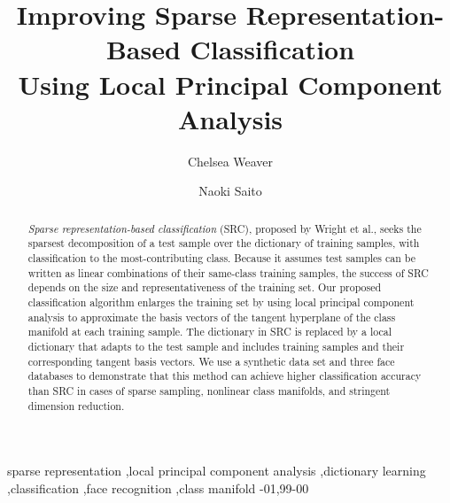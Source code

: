 \documentclass[review]{elsarticle}
\begin{document}
\theoremstyle{remark}
\newtheorem{rem}{Remark}


\begin{frontmatter}

\title{Improving Sparse Representation-Based Classification\\
 Using Local Principal Component Analysis}


\author{Chelsea Weaver}

\author{Naoki Saito}

\address{Department of Mathematics\\
University of California, Davis \\
One Shields Avenue\\
Davis, California, 95616, United States}


\begin{abstract}
\emph{Sparse representation-based classification} (SRC), proposed by Wright et al., seeks the sparsest decomposition of a test sample over the dictionary of training samples, with classification to the most-contributing class. Because it assumes test samples can be written as linear combinations of their same-class training samples, the success of SRC depends on the size and representativeness of the training set. Our proposed classification algorithm enlarges the training set by using local principal component analysis to approximate the basis vectors of the tangent hyperplane of the class manifold at each training sample. The dictionary in SRC is replaced by a local dictionary that adapts to the test sample and includes training samples and their corresponding tangent basis vectors. We use a synthetic data set and three face databases to demonstrate that this method can achieve higher classification accuracy than SRC in cases of sparse sampling, nonlinear class manifolds, and stringent dimension reduction. 
\end{abstract}


\begin{keyword}
sparse representation \sep local principal component analysis \sep dictionary learning \sep classification \sep face recognition \sep class manifold 
-01\sep  99-00
\end{keyword}

\end{frontmatter}

\end{document}
